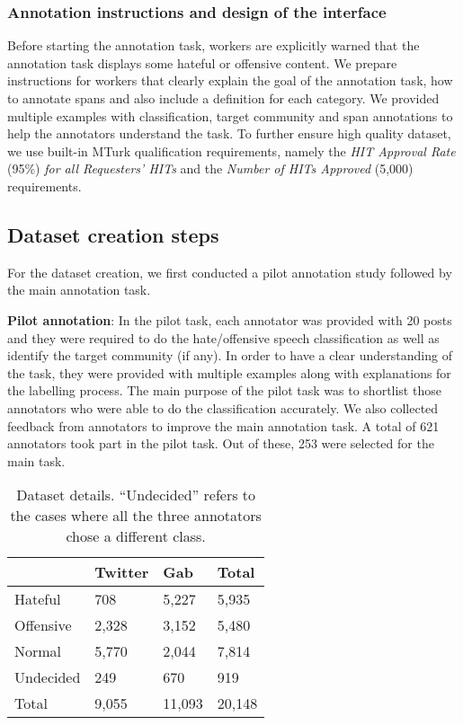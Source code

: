 \documentclass[letterpaper]{article} \usepackage{aaai21}  \usepackage{times}  \usepackage{helvet} \usepackage{courier}  \usepackage[hyphens]{url}  \usepackage{graphicx} \urlstyle{rm} \def\UrlFont{\rm}  \usepackage{natbib}  \usepackage{caption}
\begin{document}
\subsubsection{Annotation instructions and design of the interface}
Before starting the annotation task, workers are explicitly warned that the annotation task displays some hateful or offensive content.
We prepare instructions for workers that clearly explain the goal of the annotation task, how to annotate spans and also include a definition for each category. We provided multiple examples with classification, target community and span annotations to help the annotators understand the task. To further ensure high quality dataset, we use built-in MTurk qualification requirements, namely the \textit{HIT Approval Rate} (95\%) \textit{for all Requesters' HITs} and the \textit{Number of HITs Approved} (5,000) requirements.




\subsection{Dataset creation steps}
For the dataset creation, we first conducted a pilot annotation study followed by the main annotation task.

\noindent\textbf{Pilot annotation}: In the pilot task, each annotator was provided with 20 posts and they were required to do the hate/offensive speech classification as well as identify the target community (if any). In order to have a clear understanding of the task, they were provided with multiple examples along with explanations for the labelling process. The main purpose of the pilot task was to shortlist those annotators who were able to do the classification accurately. We also collected feedback from annotators to improve the main annotation task. A total of 621 annotators took part in the pilot task. Out of these, 253 were selected for the main task.


\begin{table}[!t]
\centering
\footnotesize
\begin{tabular}{l|ll|l}
          & Twitter & Gab  & Total \\ \hline
Hateful   & 708    & 5,227 & 5,935  \\
Offensive & 2,328    & 3,152 & 5,480  \\
Normal    & 5,770    & 2,044 & 7,814  \\ 
Undecided & 249     & 670  & 919 \\ \hline
Total     & 9,055    & 11,093 & 20,148 \\

\end{tabular}
\caption{Dataset details. ``Undecided'' refers to the cases where all the three annotators chose a different class.}
\label{tab:dataset_details}
\end{table}
\end{document}
